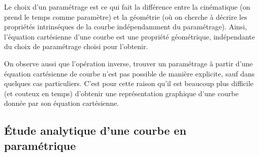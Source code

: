 \documentclass[a4paper,11pt]{article}
\begin{document}
\begin{giacjshere}
Le choix d'un param\'etrage est ce qui fait la diff\'erence
entre la cin\'ematique (on prend le temps comme param\`etre) et la 
g\'eom\'etrie
(o\`u on cherche \`a d\'ecrire les propri\'et\'es intrins\'eques
de la courbe ind\'ependamment
du param\'etrage). Ainsi, l'\'equation cart\'esienne d'une courbe
est une propri\'et\'e g\'eom\'etrique, ind\'ependante du choix
de param\'etrage choisi pour l'obtenir. 

On observe aussi que l'op\'eration
inverse, trouver un param\'etrage \`a partir d'une \'equation
cart\'esienne de courbe n'est pas possible de mani\`ere
explicite, sauf dans quelques cas particuliers. C'est pour cette
raison qu'il est beaucoup plus difficile (et couteux en temps)
d'obtenir une repr\'esentation graphique d'une courbe donn\'ee
par son \'equation cart\'esienne.

\subsection{\'Etude analytique d'une courbe en param\'etrique}


\end{giacjshere}
\end{document}
